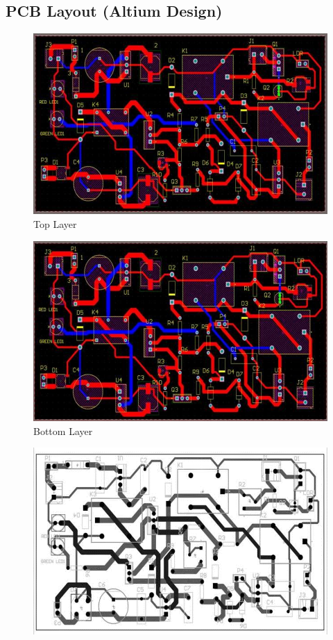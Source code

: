 \documentclass[twocolumn]{article}
\begin{document}
\begin{titlepage}
    \subsection*{PCB Layout (Altium Design)}
    
    \begin{figure}[h]
        \centering
        \includegraphics[width=12cm]{23.png}
        \caption{Top Layer}
        \label{fig:enter-label}
    \end{figure}

    \begin{figure}[h]
        \centering
        \includegraphics[width=12cm]{24.png}
        \caption{Bottom Layer}
        \label{fig:enter-label}
    \end{figure}

    \begin{figure}[h]
        \centering
        \includegraphics[width=12cm]{25.png}
        \label{fig:enter-label}
    \end{figure}


\end{titlepage}
\end{document}
